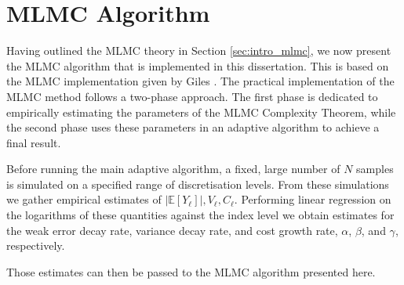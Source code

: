 \section{MLMC Algorithm}\label{sec:mlmc_algorithm}

Having outlined the MLMC theory in Section \ref{sec:intro_mlmc}, we now present 
the MLMC algorithm that is implemented in this dissertation. This is 
based on the MLMC implementation given by Giles \cite{giles2015multilevel}.
The practical implementation of the MLMC method follows a two-phase approach.
The first phase is dedicated to empirically estimating the parameters 
of the MLMC Complexity Theorem, while the
second phase uses these parameters in an adaptive algorithm 
to achieve a final result.

Before running the main adaptive algorithm, a fixed, large number of $N$ 
samples is simulated on a specified range of discretisation levels. From 
these simulations we gather empirical estimates of $|\mathbb{E}[Y_\ell]|, 
V_\ell, C_\ell$. Performing linear regression on the logarithms of these
quantities against the index level we obtain estimates for the weak error 
decay rate, variance decay rate, and cost growth rate, $\alpha$, $\beta$, and $\gamma$, 
respectively. 

Those estimates can then be passed to the MLMC algorithm presented here.

